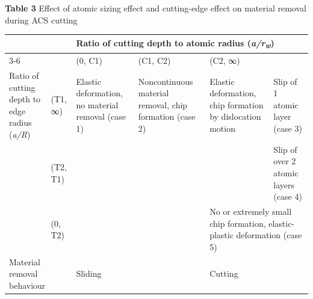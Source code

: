 \documentclass{article}
\begin{document}
\noindent\textbf{Table 3} Effect of atomic sizing effect and cutting-edge effect on material removal during ACS cutting\par
\begin{center}\footnotesize
\begin{tabular}{p{2.6cm}p{0.9cm}p{2.4cm}p{2.4cm}p{2.6cm}p{2.0cm}}
\toprule
 & & \multicolumn{4}{l}{Ratio of cutting depth to atomic radius (\emph{a/r}\textsubscript{\emph{w}})}\\
\cmidrule{3-6}
 & & (0, C1) & (C1, C2) & \multicolumn{2}{l}{(C2, ∞)}\\
\midrule
Ratio of cutting depth to edge radius (\emph{a/R}) & (T1, ∞) & Elastic deformation, no material removal (case 1) & Noncontinuous material removal, chip formation (case 2) & Elastic deformation, chip formation by dislocation motion & Slip of 1 atomic layer (case 3)\\
 & (T2, T1) & & & & Slip of over 2 atomic layers (case 4)\\
 & (0, T2) & & & \multicolumn{2}{p{4.8cm}}{No or extremely small chip formation, elastic-plastic deformation (case 5)}\\
\midrule
\multicolumn{2}{l}{Material removal behaviour} & Sliding & & Cutting & \\
\bottomrule
\end{tabular}
\end{center}
\end{document}
